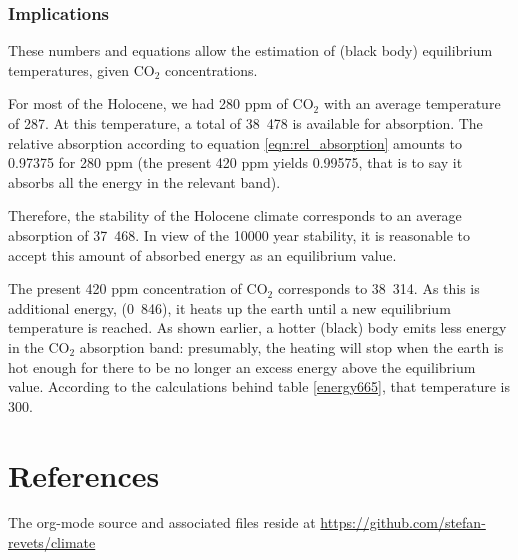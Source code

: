 \documentclass[10pt,a4paper,titlepage]{article}
\begin{document}
\subsubsection{Implications}
\label{sec-3-3-2}
These numbers and equations allow the estimation of (black body)
equilibrium temperatures, given CO$_{\text{2}}$ concentrations.

For most of the Holocene, we had 280 ppm of CO$_{\text{2}}$ with an average
temperature of \unit{287}{\kelvin}. At this temperature, a total of
\unit{38.478}{\watt\per\metre\squared} is available for absorption. The
relative absorption according to equation \ref{eqn:rel_absorption}
amounts to 0.97375 for 280 ppm (the present 420 ppm yields 0.99575,
that is to say it absorbs all the energy in the relevant band).

Therefore, the stability of the Holocene climate corresponds to an
average absorption of \unit{37.468}{\watt\per\metre\squared}. In view
of the 10000 year stability, it is reasonable to accept this amount of
absorbed energy as an equilibrium value.

The present 420 ppm concentration of CO$_{\text{2}}$ corresponds to
\unit{38.314}{\watt\per\metre\squared}. As this is additional energy,
(\unit{0.846}{\watt\per\metre\squared}), it heats up the earth until a
new equilibrium temperature is reached. As shown earlier, a hotter
(black) body emits less energy in the CO$_{\text{2}}$ absorption band:
presumably, the heating will stop when the earth is hot enough for
there to be no longer an excess energy above the equilibrium
value. According to the calculations behind table
\ref{energy665}, that temperature is \unit{300}{\kelvin}.

\section{References}
\label{sec-4}
The org-mode source and associated files reside at \url{https://github.com/stefan-revets/climate}



\end{document}
